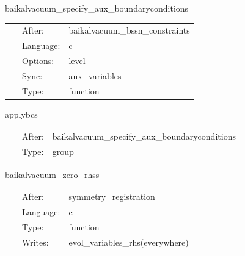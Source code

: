 \hspace{5mm} baikalvacuum\_specify\_aux\_boundaryconditions 

\hspace{5mm}{\it register boundary conditions and perform amr+interprocessor synchronization } 


\hspace{5mm}

 \begin{tabular*}{160mm}{cll} 
~ & After:  & baikalvacuum\_bssn\_constraints \\ 
~ & Language:  & c \\ 
~ & Options:  & level \\ 
~ & Sync:  & aux\_variables \\ 
~ & Type:  & function \\ 
\end{tabular*} 


\vspace{5mm}


\hspace{5mm} applybcs 

\hspace{5mm}{\it apply registered boundary conditions } 


\hspace{5mm}

 \begin{tabular*}{160mm}{cll} 
~ & After:  & baikalvacuum\_specify\_aux\_boundaryconditions \\ 
~ & Type:  & group \\ 
\end{tabular*} 


\vspace{5mm}


\hspace{5mm} baikalvacuum\_zero\_rhss 

\hspace{5mm}{\it idea from lean: set all rhs functions to zero to prevent spurious nans } 


\hspace{5mm}

 \begin{tabular*}{160mm}{cll} 
~ & After:  & symmetry\_registration \\ 
~ & Language:  & c \\ 
~ & Type:  & function \\ 
~ & Writes:  & evol\_variables\_rhs(everywhere) \\ 
\end{tabular*} 


